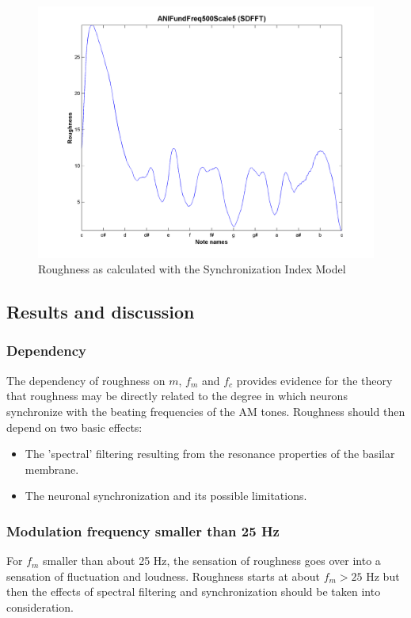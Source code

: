 \begin{figure}
    \centering
    \includegraphics[width=\IPEMDefaultFigureWidth]{Graphics/RoughnessExperiments33}
    \caption{Roughness as calculated with the Synchronization Index Model}
    \label{Fig:RoughnessExperiments33}
\end{figure}

\subsection{Results and discussion}
\subsubsection*{Dependency}
The dependency of roughness on $m$, $f_m$ and $f_c$ provides
evidence for the theory that roughness may be directly related to
the degree in which neurons synchronize with the beating
frequencies of the AM tones. Roughness should then depend on two
basic effects:
\begin{itemize}
\item
The 'spectral' filtering resulting from the resonance properties
of the basilar membrane.
\item
The neuronal synchronization and its possible limitations.
\end{itemize}

\subsubsection*{Modulation frequency smaller than 25 Hz}
For $f_m$ smaller than about 25 Hz, the sensation of roughness
goes over into a sensation of fluctuation and loudness. Roughness
starts at about $f_m > 25 $ Hz but then the effects of spectral
filtering and synchronization should be taken into consideration.

